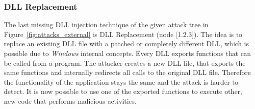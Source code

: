 \subsubsection{DLL Replacement}
The last missing \gls{DLL} injection technique of the given attack tree in Figure~\ref{fig:attacks_external} is \gls{DLL} Replacement (node [1.2.3]). The idea is to replace an existing \gls{DLL} file with a patched or completely different \gls{DLL}, which is possible due to \emph{Windows} internal concepts. Every \gls{DLL} exports functions that can be called from a program. The attacker creates a new \gls{DLL} file, that exports the same functions and internally redirects all calls to the original \gls{DLL} file. Therefore the functionality of the application stays the same and the attack is harder to detect. It is now possible to use one of the exported functions to execute other, new code that performs malicious activities.